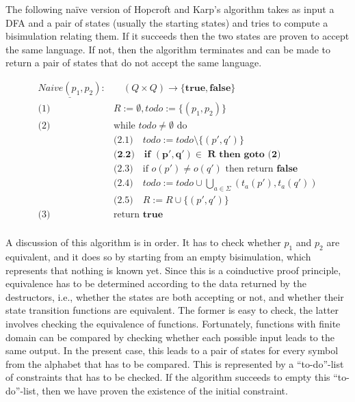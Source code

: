 The following naïve version of Hopcroft and Karp's algorithm
takes as input a DFA and a pair of states (usually the starting states)
and tries to compute a bisimulation relating them.
If it succeeds then the two states are proven to accept the same language.
If not, then the algorithm terminates and can be made to return a pair
of states that do not accept the same language.

\begin{definition}
    \begin{align*}
        \underline{\mathit{Naive(p_1, p_2)}}: &\quad (Q \times Q) \to \{\mathbf{true}, \mathbf{false}\} \\
        \text{(1) } & R := \emptyset, \mathit{todo} := \{(p_1, p_2)\} \\
        \text{(2) } & \text{while } \mathit{todo} \neq \emptyset \text{ do}\\
        & \text{(2.1)}\quad \mathit{todo} := \mathit{todo} \setminus \{(p', q')\}\\
        & \textbf{(2.2)}\quad \textbf{if } \mathbf{(p', q') \in} \textbf{ R} \textbf{ then goto (2)}\\
        & \text{(2.3)}\quad \text{if } o(p') \neq o(q') \text{ then return } \mathbf{false}\\
        & \text{(2.4)}\quad \mathit{todo} := \mathit{todo} \cup \bigcup_{a \in \Sigma}{(t_a(p'), t_a(q'))}\\
        & \text{(2.5)}\quad R := R \cup \{(p', q')\} \\
        \text{(3) } & \text{return } \mathbf{true}\\
    \end{align*}
\end{definition}

A discussion of this algorithm is in order.
It has to check whether $p_1$ and $p_2$ are equivalent,
and it does so by starting from an empty bisimulation,
which represents that nothing is known yet.
Since this is a coinductive proof principle, equivalence has to be determined according
to the data returned by the destructors, i.e., whether the states are both accepting or not,
and whether their state transition functions are equivalent.
The former is easy to check, the latter involves checking the equivalence of functions.
Fortunately, functions with finite domain can be compared by checking whether each possible
input leads to the same output.
In the present case, this leads to a pair of states for every symbol from the alphabet that has to be compared.
This is represented by a ``to-do''-list of constraints that has to be checked.
If the algorithm succeeds to empty this ``to-do''-list, then we have proven the existence of the initial constraint.

